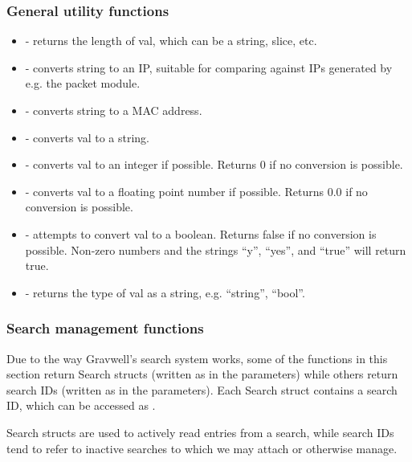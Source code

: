 \subsubsection{General utility functions}

\begin{itemize}
\tightlist
\item
   - returns the length of val, which can be a string,
  slice, etc.
\item
   - converts string to an IP, suitable for comparing
  against IPs generated by e.g. the packet module.
\item
   - converts string to a MAC address.
\item
   - converts val to a string.
\item
   - converts val to an integer if possible.
  Returns 0 if no conversion is possible.
\item
   - converts val to a floating point number
  if possible. Returns 0.0 if no conversion is possible.
\item
   - attempts to convert val to a boolean.
  Returns false if no conversion is possible. Non-zero numbers and the
  strings ``y'', ``yes'', and ``true'' will return true.
\item
   - returns the type of val as a string, e.g.
  ``string'', ``bool''.
\end{itemize}

\subsubsection{Search management functions}

Due to the way Gravwell's search system works, some of the functions in
this section return Search structs (written as  in the
parameters) while others return search IDs (written as
 in the parameters). Each Search struct contains a
search ID, which can be accessed as .

Search structs are used to actively read entries from a search, while
search IDs tend to refer to inactive searches to which we may attach or
otherwise manage.

